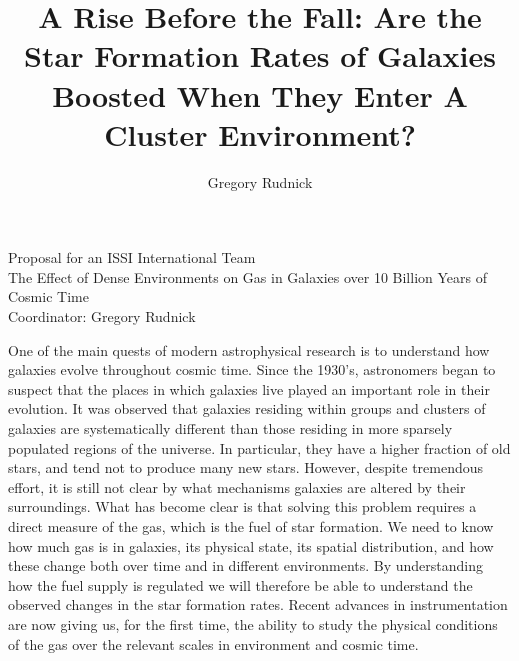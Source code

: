 \documentclass[11pt]{article}
\title{A Rise Before the Fall: Are the Star Formation Rates of Galaxies Boosted When They Enter A Cluster Environment?}  \author{Gregory Rudnick}
\newcommand{\HRule}{\rule{\linewidth}{0.3mm}}
\begin{document}






\begin{center}
\large{Proposal for an ISSI International Team}\\
\Large{The Effect of Dense Environments on Gas in Galaxies over 10 Billion Years of Cosmic Time}\\
\medskip
\vspace{-0.2cm}
\large{Coordinator: Gregory Rudnick}\\
\end{center}

One of the main quests of modern astrophysical research is to
understand how galaxies evolve throughout cosmic time.  Since the
1930's, astronomers began to suspect that the places in which galaxies
live played an important role in their evolution.  It was observed
that galaxies residing within groups and clusters of galaxies are
systematically different than those residing in more sparsely
populated regions of the universe. In particular, they have a higher
fraction of old stars, and tend not to produce many new stars.
However, despite tremendous effort, it is still not clear by what
mechanisms galaxies are altered by their surroundings.  What has
become clear is that solving this problem requires a direct measure of
the gas, which is the fuel of star formation.  We need to know how
much gas is in galaxies, its physical state, its spatial distribution,
and how these change both over time and in different environments.  By
understanding how the fuel supply is regulated we will therefore be
able to understand the observed changes in the star formation rates.
Recent advances in instrumentation are now giving us, for the first
time, the ability to study the physical conditions of the gas over the
relevant scales in environment and cosmic time.
\end{document}
